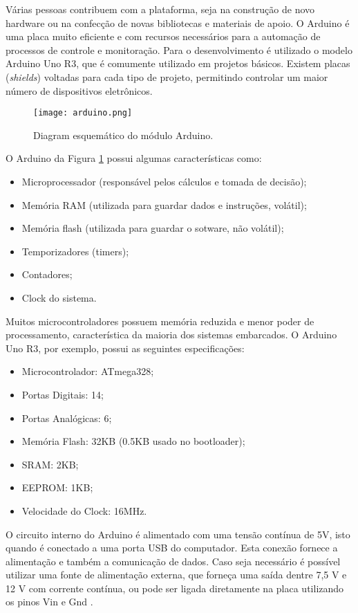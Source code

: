 \documentclass[12pt,report]{uftpibic}
\begin{document}
Várias pessoas contribuem com a plataforma, seja na construção de novo hardware ou na confecção de novas bibliotecas e materiais de apoio. O Arduino é uma placa muito eficiente e com recursos necessários para a automação de processos de controle e monitoração. Para o desenvolvimento é utilizado o modelo Arduino Uno R3, que é comumente utilizado em projetos básicos. Existem placas ({\it shields}) voltadas para cada tipo de projeto, permitindo controlar um maior número de dispositivos eletrônicos.

\begin{figure}[!h]
\centering
\texttt{[image: arduino.png]}
\caption{Diagram esquemático do módulo Arduino.}
\label{fig:arduino}
\end{figure}

O Arduino da Figura \ref{fig:arduino} possui algumas características como:

\begin{itemize}
\item Microprocessador (responsável pelos cálculos e tomada de decisão);
\item Memória RAM (utilizada para guardar dados e instruções, volátil);
\item Memória flash (utilizada para guardar o sotware, não volátil);
\item Temporizadores (timers);
\item Contadores;
\item Clock do sistema.
\end{itemize}

Muitos microcontroladores possuem memória reduzida e menor poder de processamento, característica da maioria dos sistemas embarcados. O Arduino Uno R3, por exemplo, possui as seguintes especificações:

\begin{itemize}
\item Microcontrolador: ATmega328;
\item Portas Digitais: 14;
\item Portas Analógicas: 6;
\item Memória Flash: 32KB (0.5KB usado no bootloader);
\item SRAM: 2KB;
\item EEPROM: 1KB;
\item Velocidade do Clock: 16MHz.
\end{itemize}

O circuito interno do Arduino é alimentado com uma tensão contínua de 5V, isto quando é conectado a uma porta USB do computador. Esta conexão fornece a alimentação e também a comunicação de dados. Caso seja necessário é possível utilizar uma fonte de alimentação externa, que forneça uma saída dentre 7,5 V e 12 V com corrente contínua, ou pode ser ligada diretamente na placa utilizando os pinos Vin e Gnd \cite{marcos}.
\end{document}
